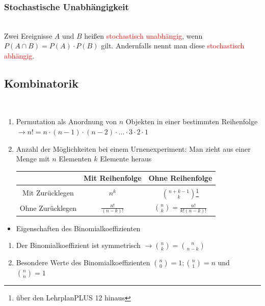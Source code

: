 \subsubsection{Stochastische Unabhängigkeit}\\
Zwei Ereignisse $A$ und $B$ heißen \textcolor{red}{stochastisch unabhängig}, wenn $P(A \cap B) = P(A)\cdot P(B)$ gilt. Andernfalls nennt man diese \textcolor{red}{stochastisch abhängig}.
\subsection{Kombinatorik}\\
\begin{enumerate}
    \item Permutation als  Anordnung von $n$ Objekten in einer bestimmten Reihenfolge $\longrightarrow n! = n\cdot ( n-1) \cdot (n-2)\cdot \ldots \cdot 3\cdot  2\cdot 1$\\
    \item Anzahl der Möglichkeiten bei einem Urnenexperiment: Man zieht aus einer Menge mit $n$ Elementen $k$ Elemente heraus\\
    \begin{tabular}{|c||c|c|}
    \hline
         &  Mit Reihenfolge & Ohne Reihenfolge\\
           \hline\hline
     Mit Zurücklegen   & $n^k$ & $\binom{n+k-1}{k}$\footnote{über den LehrplanPLUS 12 hinaus}\\
     \hline
     Ohne Zurücklegen & $\frac{n!}{\left(n-k\right)!}$& $\binom{n}{k} = \frac{n!}{k!\left(n-k\right)!}$\\
     \hline
    \end{tabular} 
\end{enumerate}
\begin{itemize}
\item Eigenschaften des Binomialkoeffizienten
\end{itemize}
\begin{enumerate}
    \item Der Binomialkoeffizient ist symmetrisch $\longrightarrow \binom{n}{k} = \binom{n}{n-k}$\\
    \item Besondere Werte des Binomialkoeffizienten $\binom{n}{0}= 1; \binom{n}{1} = n$ und $\binom{n}{n}=1$
\end{enumerate}
\newpage
